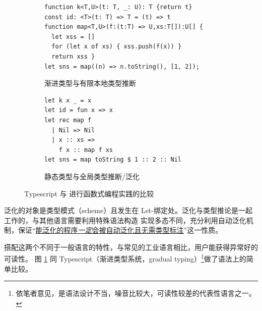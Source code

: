 \begin{figure}[H]\centering
  \begin{subfigure}{0.6\textwidth}\centering
    \begin{verbatim}
function k<T,U>(t: T, _: U): T {return t}
const id: <T>(t: T) => T = (t) => t
function map<T,U>(f:(t:T) => U,xs:T[]):U[] {
  let xss = []
  for (let x of xs) { xss.push(f(x)) }
  return xss }
let sns = map((n) => n.toString(), [1, 2]);
    \end{verbatim}
    \caption{渐进类型与有限本地类型推断}
  \end{subfigure}%
  \begin{subfigure}{0.4\textwidth}\centering
    \begin{verbatim}
let k x _ = x
let id = fun x => x
let rec map f
  | Nil => Nil
  | x :: xs =>
    f x :: map f xs
let sns = map toString $ 1 :: 2 :: Nil
    \end{verbatim}
    \caption{静态类型与全局类型推断/泛化}
  \end{subfigure}
  \caption{Typescript 与 \Tigris 进行函数式编程实践的比较}\label{code:ts-tig}
\end{figure}

泛化的对象是类型模式（scheme）且发生在 Let-绑定处。泛化与类型推论是一起工作的，与其他语言需要利用特殊语法构造
实现多态不同，\Tigris 充分利用自动泛化机制，保证“\underline{能泛化的程序\emph{一定}会被自动泛化且无需类型标注}”这一性质。

搭配这两个不同于一般语言的特性，与常见的工业语言相比，用户能获得异常好的可读性。
图 \ref{code:ts-tig} 同 Typescript（渐进类型系统，gradual typing）\footnote{
  依笔者意见，是语法设计不当，噪音比较大，可读性较差的代表性语言之一。
}做了语法上的简单比较。

